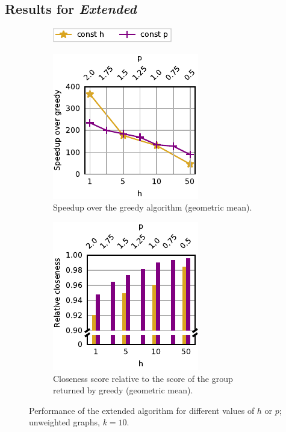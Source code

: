 \subsection{Results for \emph{Extended} \growshrink}
\label{sec:lsh-gc-exp-extended-gs}
%
\begin{figure}[tb]
\centering
\begin{subfigure}[t]{\textwidth}
\centering
\includegraphics{./sources/plots/local-search-heu/legend-h-p-params.pdf}
\end{subfigure}

\begin{subfigure}[t]{.45\textwidth}
\centering
\includegraphics{./sources/plots/local-search-heu/speedups-h-p-params.pdf}
\caption{Speedup over the greedy algorithm (geometric mean).}
\end{subfigure}\hfill
\begin{subfigure}[t]{.45\textwidth}
\centering
\includegraphics{./sources/plots/local-search-heu/quality-h-p-params.pdf}
\caption{Closeness score relative to the score of the group returned
by greedy (geometric mean).}
\label{fig:lsh-gc-quality-h-p}
\end{subfigure}\hfill
\caption{Performance of the extended \growshrink algorithm
for different values of $h$ or $p$;
unweighted graphs, $k = 10$.}
\label{fig:lsh-gc-h-p}
\end{figure}

